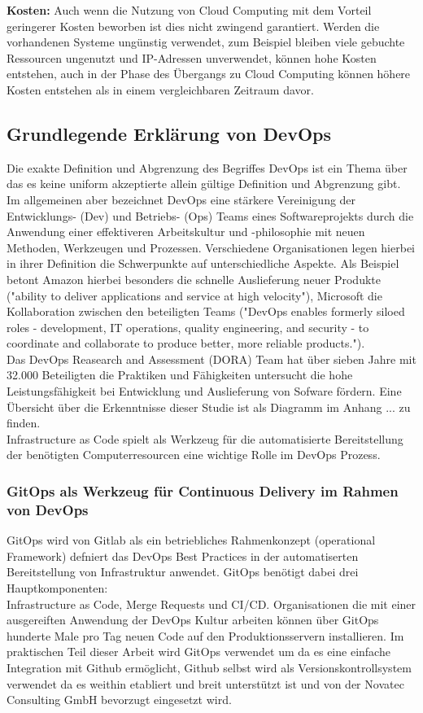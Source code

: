 \textbf{Kosten:} Auch wenn die Nutzung von Cloud Computing mit dem Vorteil
geringerer Kosten beworben ist dies nicht zwingend garantiert. Werden die
vorhandenen Systeme ungünstig verwendet, zum Beispiel bleiben viele gebuchte
Ressourcen ungenutzt und IP-Adressen unverwendet, können hohe Kosten entstehen,
auch in der Phase des Übergangs zu Cloud Computing können höhere Kosten
entstehen als in einem vergleichbaren Zeitraum davor.


\subsection{\textbf{Grundlegende Erklärung von DevOps}}

Die exakte Definition und Abgrenzung des Begriffes DevOps ist ein Thema über
das es keine uniform akzeptierte allein gültige Definition und Abgrenzung gibt.
Im allgemeinen aber bezeichnet DevOps eine stärkere Vereinigung der Entwicklungs-
(Dev) und Betriebs- (Ops) Teams eines Softwareprojekts durch die Anwendung
einer effektiveren Arbeitskultur und -philosophie mit neuen Methoden, Werkzeugen und
Prozessen. Verschiedene Organisationen legen hierbei in ihrer Definition die
Schwerpunkte auf unterschiedliche Aspekte.
Als Beispiel betont Amazon hierbei besonders die schnelle Auslieferung neuer
Produkte ("ability to deliver applications and service at high velocity"),
Microsoft
die Kollaboration zwischen den beteiligten Teams ("DevOps enables formerly
siloed roles - development, IT operations, quality engineering, and security -
to coordinate and collaborate to produce better, more reliable products.").\\
Das DevOps Reasearch and Assessment (DORA) Team
hat über sieben Jahre mit 32.000 Beteiligten die Praktiken und 
Fähigkeiten untersucht die hohe Leistungsfähigkeit bei Entwicklung und
Auslieferung von Sofware fördern. Eine Übersicht über die Erkenntnisse dieser
Studie ist als Diagramm im Anhang ... zu finden.\\
Infrastructure as Code spielt als Werkzeug für die automatisierte Bereitstellung
der benötigten Computerresourcen eine wichtige Rolle im DevOps Prozess.

\subsubsection{\textbf{GitOps als Werkzeug für Continuous Delivery im Rahmen von DevOps}}

GitOps wird von Gitlab als ein betriebliches Rahmenkonzept (operational
Framework) defniert das DevOps Best Practices in der automatiserten
Bereitstellung von Infrastruktur anwendet.
GitOps benötigt dabei drei Hauptkomponenten:\\
Infrastructure as Code, Merge Requests und CI/CD.
Organisationen die mit einer ausgereiften Anwendung der DevOps Kultur arbeiten
können über GitOps hunderte Male pro Tag neuen Code auf den Produktionsservern
installieren. Im praktischen Teil dieser Arbeit wird GitOps verwendet um
da es eine einfache Integration mit Github ermöglicht, Github selbst
wird als Versionskontrollsystem verwendet da es weithin etabliert und breit
unterstützt ist und von der Novatec Consulting GmbH bevorzugt eingesetzt wird.

